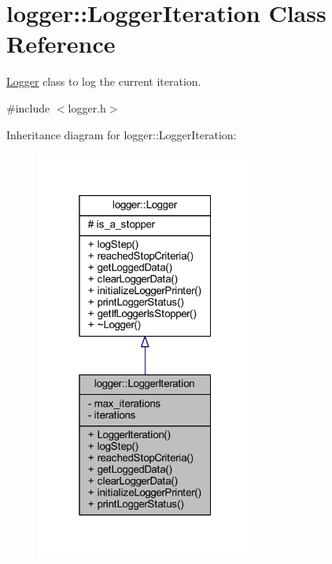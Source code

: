 \hypertarget{classlogger_1_1_logger_iteration}{}\section{logger\+:\+:Logger\+Iteration Class Reference}
\label{classlogger_1_1_logger_iteration}


\mbox{\hyperlink{classlogger_1_1_logger}{Logger}} class to log the current iteration.  




{\ttfamily \#include $<$logger.\+h$>$}



Inheritance diagram for logger\+:\+:Logger\+Iteration\+:
\nopagebreak
\begin{figure}[H]
\begin{center}
\leavevmode
\includegraphics[width=205pt]{classlogger_1_1_logger_iteration__inherit__graph}
\end{center}
\end{figure}


